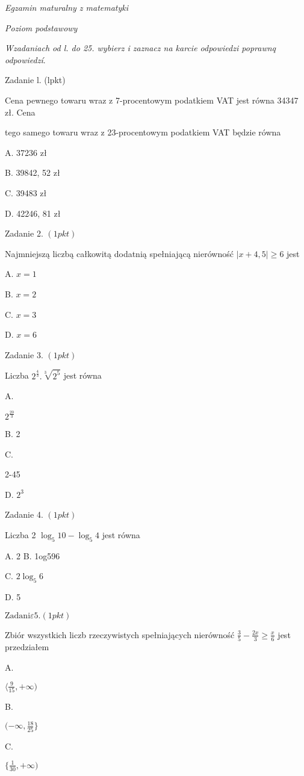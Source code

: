 \documentclass[a4paper,12pt]{article}
\begin{document}
{\it Egzamin maturalny z matematyki}

{\it Poziom podstawowy}

{\it Wzadaniach od l. do 25. wybierz i zaznacz na karcie odpowiedzi poprawnq odpowiedzí}.

Zadanie l. (lpkt)

Cena pewnego towaru wraz z 7-procentowym podatkiem VAT jest równa 34347 zł. Cena

tego samego towaru wraz z 23-procentowym podatkiem VAT będzie równa

A. 37236 zł

B. 39842, 52 zł

C. 39483 zł

D. 42246, 81 zł

Zadanie 2. $(1pkt)$

Najmniejszą liczbą całkowitą dodatnią spełniającą nierówność $|x+4,5|\geq 6$ jest

A. $x=1$

B. $x=2$

C. $x=3$

D. $x=6$

Zadanie 3. $(1pkt)$

Liczba $2^{\frac{4}{3}}. \sqrt[3]{2^{5}}$ jest równa

A.

$2^{\frac{20}{3}}$

B. 2

C.

2-45

D. $2^{3}$

Zadanie 4. $(1pkt)$

Liczba 2 $\log_{5}10-\log_{5}4$ jest równa

A. 2 B. 1og596

C. $2\log_{5}6$

D. 5

$\mathrm{Z}\mathrm{a}\mathrm{d}\mathrm{a}\mathrm{n}\mathrm{i}\varepsilon 5. (1pkt)$

Zbiór wszystkich liczb rzeczywistych spełniających nierówność $\displaystyle \frac{3}{5}-\frac{2x}{3}\geq\frac{x}{6}$ jest przedziałem

A.

$\displaystyle \langle\frac{9}{15},+\infty)$

B.

$(-\displaystyle \infty,\frac{18}{25}\}$

C.

$\displaystyle \{\frac{1}{30},+\infty)$
\end{document}
